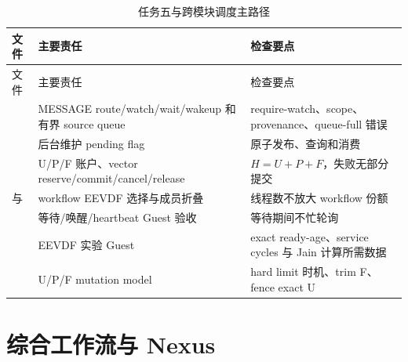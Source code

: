 \begin{longtable}{L{3.8cm}L{3.3cm}L{6.2cm}}
  \caption{任务五与跨模块调度主路径}\label{tab:source-sched}\\
  \toprule
  文件 & 主要责任 & 检查要点 \\
  \midrule
  \endfirsthead
  \toprule
  文件 & 主要责任 & 检查要点 \\
  \midrule
  \endhead
   & MESSAGE route/watch/wait/wakeup 和有界 source queue & require-watch、scope、provenance、queue-full 错误 \\
   & 后台维护 pending flag & 原子发布、查询和消费 \\
   & U/P/F 账户、vector reserve/commit/cancel/release & $H=U+P+F$，失败无部分提交 \\
   与  & workflow EEVDF 选择与成员折叠 & 线程数不放大 workflow 份额 \\
   & 等待/唤醒/heartbeat Guest 验收 & 等待期间不忙轮询 \\
   & EEVDF 实验 Guest & exact ready-age、service cycles 与 Jain 计算所需数据 \\
   & U/P/F mutation model & hard limit 时机、trim F、fence exact U \\
  \bottomrule
\end{longtable}

\section{综合工作流与 Nexus}

